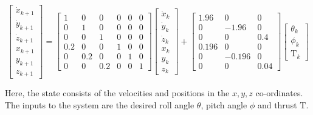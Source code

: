 {\tiny
\vspace{-10pt}
\begin{equation}
\label{eq:quad_dyn}
\begin{bmatrix} \dot{x}_{k+1} \\ \dot{y}_{k+1} \\ \dot{z}_{k+1} \\ x_{k+1} \\ y_{k+1} \\ z_{k+1} \end{bmatrix}= \begin{bmatrix} 1&0&0&0&0&0 \\0&1&0&0&0&0 \\0&0&1&0&0&0 \\0.2&0&0&1&0&0 \\0&0.2&0&0&1&0 \\0&0&0.2&0&0&1\end{bmatrix} \begin{bmatrix} \dot{x}_{k} \\ \dot{y}_{k} \\ \dot{z}_{k} \\ x_{k} \\ y_{k} \\ z_{k} \end{bmatrix} + \begin{bmatrix} 1.96&0&0 \\ 0&-1.96&0 \\0&0&0.4 \\0.196&0&0 \\0&-0.196&0\\0&0&0.04 \end{bmatrix} \begin{bmatrix} \theta_k \\ \phi_k \\ \text{T}_k \end{bmatrix}
\end{equation}
\vspace{-10pt}
}

Here, the state consists of the velocities and positions in the $x,y,z$ co-ordinates. 
The inputs to the system are the desired roll angle $\theta$, pitch angle $\phi$ and thrust $\text{T}$. 



